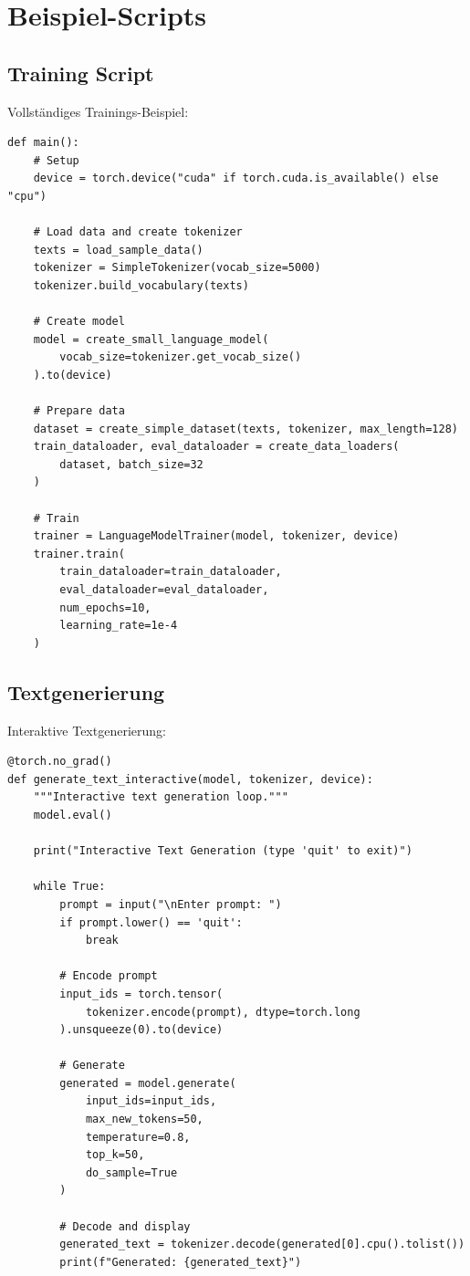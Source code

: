 \section{Beispiel-Scripts}

\subsection{Training Script}

Vollständiges Trainings-Beispiel:

\begin{lstlisting}[style=pythonstyle, caption=Training Example]
def main():
    # Setup
    device = torch.device("cuda" if torch.cuda.is_available() else "cpu")
    
    # Load data and create tokenizer
    texts = load_sample_data()
    tokenizer = SimpleTokenizer(vocab_size=5000)
    tokenizer.build_vocabulary(texts)
    
    # Create model
    model = create_small_language_model(
        vocab_size=tokenizer.get_vocab_size()
    ).to(device)
    
    # Prepare data
    dataset = create_simple_dataset(texts, tokenizer, max_length=128)
    train_dataloader, eval_dataloader = create_data_loaders(
        dataset, batch_size=32
    )
    
    # Train
    trainer = LanguageModelTrainer(model, tokenizer, device)
    trainer.train(
        train_dataloader=train_dataloader,
        eval_dataloader=eval_dataloader,
        num_epochs=10,
        learning_rate=1e-4
    )
\end{lstlisting}

\subsection{Textgenerierung}

Interaktive Textgenerierung:

\begin{lstlisting}[style=pythonstyle, caption=Text Generation Script]
@torch.no_grad()
def generate_text_interactive(model, tokenizer, device):
    """Interactive text generation loop."""
    model.eval()
    
    print("Interactive Text Generation (type 'quit' to exit)")
    
    while True:
        prompt = input("\nEnter prompt: ")
        if prompt.lower() == 'quit':
            break
        
        # Encode prompt
        input_ids = torch.tensor(
            tokenizer.encode(prompt), dtype=torch.long
        ).unsqueeze(0).to(device)
        
        # Generate
        generated = model.generate(
            input_ids=input_ids,
            max_new_tokens=50,
            temperature=0.8,
            top_k=50,
            do_sample=True
        )
        
        # Decode and display
        generated_text = tokenizer.decode(generated[0].cpu().tolist())
        print(f"Generated: {generated_text}")
\end{lstlisting}

